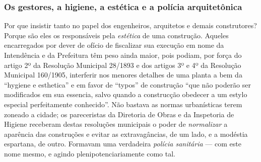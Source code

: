 \subsubsection{Os gestores, a higiene, a estética e a polícia arquitetônica}

Por que insistir tanto no papel dos engenheiros, arquitetos e demais construtores? Porque são eles os responsáveis pela \textit{estética} de uma construção. Aqueles encarregados por dever de ofício de fiscalizar sua execução em nome da Intendência e da Prefeitura têm peso ainda maior, pois podiam, por força do artigo 2º da Resolução Municipal 28/1893 e dos artigos 3º e 4º da Resolução Municipal 160/1905, interferir nos menores detalhes de uma planta a bem da ``hygiene e esthetica'' e em favor de ``typos'' de construção ``que não poderão ser modificados em sua essencia, salvo quando a construcção obedecer a um estylo especial perfeitamente conhecido''. Não bastava as normas urbanísticas terem zoneado a cidade; os pareceristas da Diretoria de Obras e da Inspetoria de Higiene receberam destas resoluções municipais o poder de \textit{normalizar} a aparência das construções e evitar as extravagâncias, de um lado, e a modéstia espartana, de outro. Formavam uma verdadeira \textit{polícia sanitária} --- com este nome mesmo, e agindo plenipotenciariamente como tal. 

